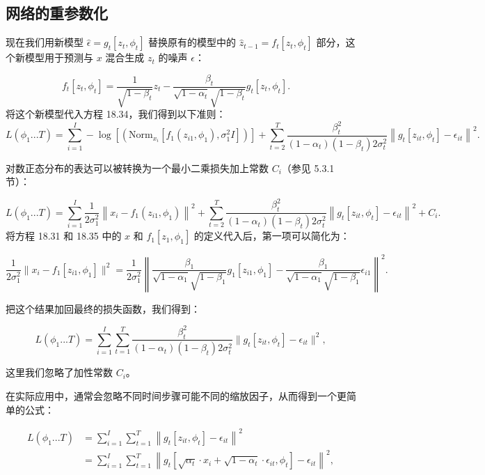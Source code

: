 \subsection{网络的重参数化}
现在我们用新模型 \(\hat{\epsilon} = g_t[z_t, \phi_t]\) 替换原有的模型中的 \(\hat{z}_{t-1} = f_t[z_t, \phi_t]\) 部分，这个新模型用于预测与 \(x\) 混合生成 \(z_t\) 的噪声 \(\epsilon\)：

\[
f_t[z_t, \phi_t] = \frac{1}{\sqrt{1 - \beta_t}}z_t - \frac{\beta_t}{\sqrt{1 - \alpha_t}\sqrt{1 - \beta_t}}g_t[z_t, \phi_t].
\quad \tag{18.35}
\]
将这个新模型代入方程 18.34，我们得到以下准则：
\[
L(\phi_1...T) = \sum_{i=1}^{I} -\log \left[  \left( \text{Norm}_{x_i} [f_1(z_{i1}, \phi_1), \sigma_1^2 I] \right) \right] + \sum_{t=2}^{T} \frac{\beta_t^2}{(1 - \alpha_t)(1 - \beta_t)2\sigma_t^2} \left\| g_t[z_{it}, \phi_t] - \epsilon_{it} \right\|^2 . \tag{18.36}
\]

对数正态分布的表达可以被转换为一个最小二乘损失加上常数 \(C_i\)（参见 5.3.1 节）：

\[
L(\phi_1...T) = \sum_{i=1}^{I} \frac{1}{2\sigma_1^2} \left\| x_i - f_1(z_{i1}, \phi_1) \right\|^2 + \sum_{t=2}^{T} \frac{\beta_t^2}{(1 - \alpha_t)(1 - \beta_t)2\sigma_t^2} \left\| g_t[z_{it}, \phi_t] - \epsilon_{it} \right\|^2 + C_i.
\]
将方程 18.31 和 18.35 中的 \(x\) 和 \(f_1[z_1, \phi_1]\) 的定义代入后，第一项可以简化为：

\[
\frac{1}{2\sigma_1^2} \|x_i - f_1[z_{i1}, \phi_1]\|^2 = \frac{1}{2\sigma_1^2} \left\| \frac{\beta_1}{\sqrt{1 - \alpha_1}\sqrt{1 - \beta_1}} g_1[z_{i1}, \phi_1] - \frac{\beta_1}{\sqrt{1 - \alpha_1}\sqrt{1 - \beta_1}} \epsilon_{i1} \right\|^2. \tag{18.37}
\]

把这个结果加回最终的损失函数，我们得到：

\[
L(\phi_1...T) = \sum_{i=1}^{I} \sum_{t=1}^{T} \frac{\beta_t^2}{(1 - \alpha_t)(1 - \beta_t)2\sigma_t^2} \| g_t[z_{it}, \phi_t] - \epsilon_{it} \|^2, \tag{18.38}
\]

这里我们忽略了加性常数 \(C_i\)。

在实际应用中，通常会忽略不同时间步骤可能不同的缩放因子，从而得到一个更简单的公式：


\begin{align}
L(\phi_1...T) &= \sum_{i=1}^{I} \sum_{t=1}^{T} \left\| g_t[z_{it}, \phi_t] - \epsilon_{it} \right\|^2 \\
&= \sum_{i=1}^{I} \sum_{t=1}^{T} \left\| g_t \left[ \sqrt{\alpha_t} \cdot x_i + \sqrt{1 - \alpha_t} \cdot \epsilon_{it}, \phi_t \right] - \epsilon_{it} \right\|^2,
\end{align} 

